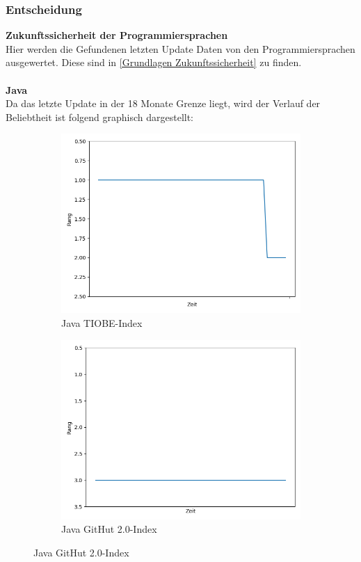 \documentclass[ngerman]{article}
\begin{document}
    \subsubsection{Entscheidung}
    \label{ProgrammiersprachenEntscheidung}
    \textbf{Zukunftssicherheit der Programmiersprachen}\\
    Hier werden die Gefundenen letzten Update Daten von den Programmiersprachen ausgewertet. Diese sind in \ref{Grundlagen Zukunftssicherheit} zu finden.\\\\
    \textbf{Java}\\
    Da das letzte Update in der 18 Monate Grenze liegt, wird der Verlauf der Beliebtheit ist folgend graphisch dargestellt:
    \begin{figure}[h!]
        \begin{subfigure}[h!]{.5\textwidth}
            \caption{Java TIOBE-Index}
            \centering
            \includegraphics[scale=.25]{JavaTIOBE.png}
        \end{subfigure}
        \begin{subfigure}[h!]{.5\textwidth}
            \caption{Java GitHut 2.0-Index}
            \centering
            \includegraphics[scale=.25]{JavaGitHut.png}
        \end{subfigure}
    \end{figure}\\
\end{document}

